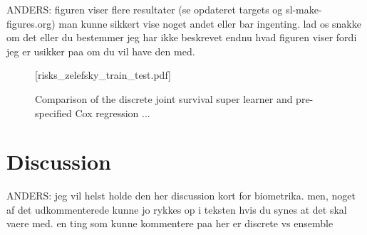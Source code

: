 \documentclass[lineno]{biometrika}
\newcommand{\1}{\mathds{1}}
\begin{document}
ANDERS: figuren viser flere resultater (se opdateret targets og sl-make-figures.org)
man kunne sikkert vise noget andet eller bar ingenting. lad os snakke om det eller du bestemmer
jeg har ikke beskrevet endnu hvad figuren viser fordi jeg er usikker paa om du vil have den med. 

\begin{figure}
\figurebox{20pc}{25pc}{}[risks_zelefsky_train_test.pdf]
\caption{Comparison of the discrete joint survival super learner and pre-specified Cox regression ...}
\label{fig:zelefski-real}
\end{figure}


\section{Discussion}
\label{sec:discussion}

ANDERS: jeg vil helst holde den her discussion kort for biometrika. men, noget af det udkommenterede
kunne jo rykkes op i teksten hvis du synes at det skal vaere med. en ting som kunne kommentere paa her
er discrete vs ensemble 


\end{document}
